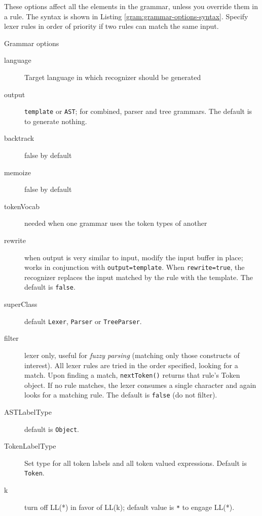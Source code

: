 These options affect all the elements in the grammar,
unless you override them in a rule.
The syntax is shown in Listing \ref{gram:grammar-options-syntax}.
Specify lexer rules in order of priority if two rules can match the same input.

\begin{program}
\caption{Grammar options\label{gram:grammar-options-syntax}}
\end{program}

\begin{description}
\item[language]
Target language in which recognizer should be generated
\item[output]
\verb=template= or \verb=AST=; for combined, parser and tree grammars.
The default is to generate nothing.
\item[backtrack]
false by default
\item[memoize]
false by default
\item[tokenVocab]
needed when one grammar uses the token types of another
\item[rewrite]
when output is very similar to input, modify the input buffer in place;
works in conjunction with \verb|output=template|.
When \verb_rewrite=true_, the recognizer replaces the input matched by the rule
with the template. The default is \verb-false-.
\item[superClass]
default \verb=Lexer=, \verb=Parser= or \verb=TreeParser=.
\item[filter]
lexer only, useful for \emph{fuzzy parsing}
(matching only those constructs of interest).
All lexer rules are tried in the order specified, looking for a match.
Upon finding a match, \verb=nextToken()= returns that rule's Token object.
If no rule matches,
the lexer consumes a single character and again looks for a matching rule.
The default is \verb=false= (do not filter).
\item[ASTLabelType]
default is \verb=Object=.
\item[TokenLabelType]
Set type for all token labels and all token valued expressions.
Default is \verb=Token=.
\item[k]
turn off LL(*) in favor of LL(k);
default value is \verb=*= to engage LL(*).
\end{description}
